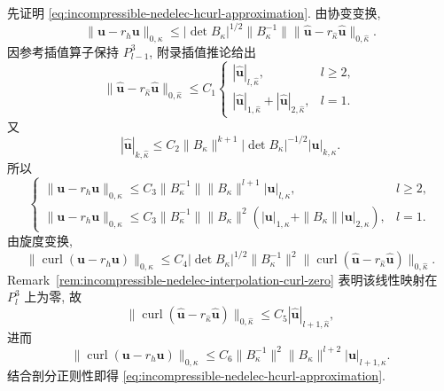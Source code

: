 \begin{Proof}
先证明 \eqref{eq:incompressible-nedelec-hcurl-approximation}.
由协变变换,
\[
\|\mathbf u-r_h\mathbf u\|_{0,\kappa}
\leq|\det B_\kappa|^{1/2}\|B_\kappa^{-1}\|
\|\widehat{\mathbf u}-r_{\widehat\kappa}
\widehat{\mathbf u}\|_{0,\widehat\kappa}.
\]
因参考插值算子保持 $P_{l-1}^3$, 附录插值推论给出
\[
\|\widehat{\mathbf u}-r_{\widehat\kappa}
\widehat{\mathbf u}\|_{0,\widehat\kappa}
\leq C_1
\begin{cases}
|\widehat{\mathbf u}|_{l,\widehat\kappa},&l\geq2,\\
|\widehat{\mathbf u}|_{1,\widehat\kappa}
+|\widehat{\mathbf u}|_{2,\widehat\kappa},&l=1.
\end{cases}
\]
又
\begin{equation}\label{eq:incompressible-nedelec-transformed-seminorm}
|\widehat{\mathbf u}|_{k,\widehat\kappa}
\leq C_2\|B_\kappa\|^{k+1}|\det B_\kappa|^{-1/2}
|\mathbf u|_{k,\kappa}.
\end{equation}
所以
\begin{equation}\label{eq:incompressible-nedelec-local-l2-estimate}
\begin{cases}
\|\mathbf u-r_h\mathbf u\|_{0,\kappa}
\leq C_3\|B_\kappa^{-1}\|\|B_\kappa\|^{l+1}
|\mathbf u|_{l,\kappa},&l\geq2,\\
\|\mathbf u-r_h\mathbf u\|_{0,\kappa}
\leq C_3\|B_\kappa^{-1}\|\|B_\kappa\|^2
(|\mathbf u|_{1,\kappa}+\|B_\kappa\||\mathbf u|_{2,\kappa}),&l=1.
\end{cases}
\end{equation}
由旋度变换,
\[
\|\operatorname{curl}(\mathbf u-r_h\mathbf u)\|_{0,\kappa}
\leq C_4|\det B_\kappa|^{1/2}\|B_\kappa^{-1}\|^2
\|\operatorname{curl}(\widehat{\mathbf u}
-r_{\widehat\kappa}\widehat{\mathbf u})\|_{0,\widehat\kappa}.
\]
Remark~\ref{rem:incompressible-nedelec-interpolation-curl-zero}
表明该线性映射在 $P_l^3$ 上为零, 故
\[
\|\operatorname{curl}(\widehat{\mathbf u}
-r_{\widehat\kappa}\widehat{\mathbf u})\|_{0,\widehat\kappa}
\leq C_5|\widehat{\mathbf u}|_{l+1,\widehat\kappa},
\]
进而
\begin{equation}\label{eq:incompressible-nedelec-local-curl-estimate}
\|\operatorname{curl}(\mathbf u-r_h\mathbf u)\|_{0,\kappa}
\leq C_6\|B_\kappa^{-1}\|^2\|B_\kappa\|^{l+2}
|\mathbf u|_{l+1,\kappa}.
\end{equation}
结合剖分正则性即得
\eqref{eq:incompressible-nedelec-hcurl-approximation}.


\end{Proof}
